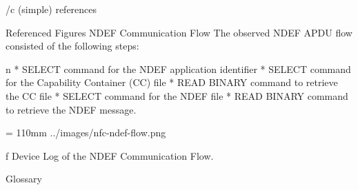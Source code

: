 \bibchap

\usebib/c (simple) references

\app Referenced Figures
 NDEF Communication Flow
The observed NDEF APDU flow consisted of the following steps:

\begitems \style n
* SELECT command for the NDEF application identifier
* SELECT command for the Capability Container (CC) file
* READ BINARY command to retrieve the CC file 
* SELECT command for the NDEF file 
* READ BINARY command to retrieve the NDEF message.
\enditems

\midinsert
{}
\picheight = 110mm \cinspic ../images/nfc-ndef-flow.png
\caption /f Device Log of the NDEF Communication Flow.
\endinsert

\app Glossary 

\makeglos
